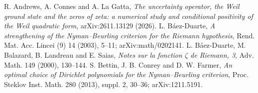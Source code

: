 %
 R. Andrews, A. Connes and A. La Gatta, \emph{The uncertainty operator, the Weil ground state and the
zeros   of zeta: a numerical study and conditional positivity of the Weil quadratic form}, arXiv:2611.13129 (2026).
 L. B\'aez-Duarte, \emph{A strengthening of the Nyman--Beurling criterion for the Riemann
  hypothesis}, Rend. Mat. Acc. Lincei (9) 14 (2003), 5--11; arXiv:math/0202141.
 L. B\'aez-Duarte, M. Balazard, B. Landreau and E. Saias, \emph{Notes sur la fonction $\zeta$ de
  Riemann, 3}, Adv. Math. 149 (2000), 130--144.
 S. Bettin, J. B. Conrey and D. W. Farmer, \emph{An optimal choice of Dirichlet polynomials for the
  Nyman--Beurling criterion}, Proc. Steklov Inst. Math. 280 (2013), suppl. 2, 30--36; arXiv:1211.5191.
